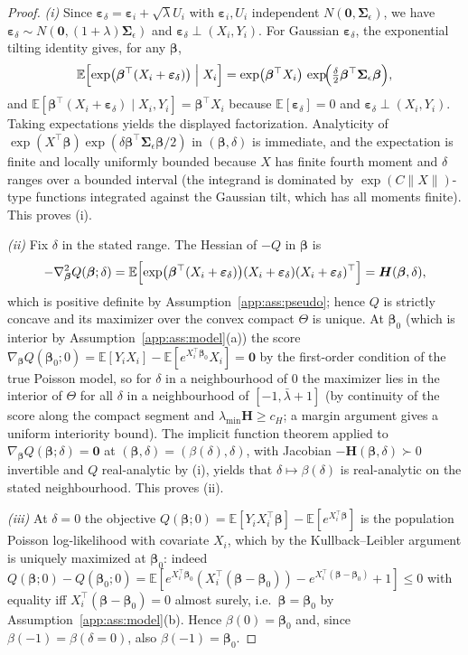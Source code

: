 \documentclass[11pt]{article}
\theoremstyle{plain}
\theoremstyle{definition}
\newcommand{\E}{\mathbb{E}}
\newcommand{\bet}{\bm{\beta}}
\newcommand{\beps}{\bm{\varepsilon}}
\newcommand{\bSig}{\bm{\Sigma}}
\begin{document}
\begin{proof}
\emph{(i)} Since $\beps_\delta=\beps_i+\sqrt\lambda U_i$ with
$\beps_i,U_i$ independent $N(\bm 0,\bSig_\epsilon)$, we have
$\beps_\delta\sim N(\bm 0,(1+\lambda)\bSig_\epsilon)$ and
$\beps_\delta\perp(X_i,Y_i)$. For Gaussian $\beps_\delta$, the exponential
tilting identity gives, for any $\bet$,
\[
  \E\Bigl[\exp\bigl(\bet^\top(X_i+\beps_\delta)\bigr)\Bigm|X_i\Bigr]
  =\exp\bigl(\bet^\top X_i\bigr)\,
   \exp\!\Bigl(\tfrac{\delta}{2}\bet^\top\bSig_\epsilon\bet\Bigr),
\]
and $\E[\bet^\top(X_i+\beps_\delta)\mid X_i,Y_i]=\bet^\top X_i$ because
$\E[\beps_\delta]=0$ and $\beps_\delta\perp(X_i,Y_i)$. Taking expectations
yields the displayed factorization. Analyticity of
$\exp(X^\top\bet)\exp(\delta\bet^\top\bSig_\epsilon\bet/2)$ in
$(\bet,\delta)$ is immediate, and the expectation is finite and
locally uniformly bounded because $X$ has finite fourth moment and
$\delta$ ranges over a bounded interval (the integrand is dominated by
$\exp(C\|X\|)$-type functions integrated against the Gaussian tilt, which
has all moments finite). This proves (i).

\emph{(ii)} Fix $\delta$ in the stated range. The Hessian of $-Q$ in
$\bet$ is
\[
  -\nabla_{\bet}^2Q(\bet;\delta)
  =\E\Bigl[\exp\bigl(\bet^\top(X_i+\beps_\delta)\bigr)
   (X_i+\beps_\delta)(X_i+\beps_\delta)^\top\Bigr]
  =\bm H(\bet,\delta),
\]
which is positive definite by Assumption~\ref{app:ass:pseudo}; hence $Q$ is
strictly concave and its maximizer over the convex compact $\Theta$ is
unique. At $\bet_0$ (which is interior by Assumption~\ref{app:ass:model}(a))
the score
$\nabla_{\bet} Q(\bet_0;0)=\E[Y_iX_i]-\E[e^{X_i^\top\bet_0}X_i]=\bm 0$
by the first-order condition of the true Poisson model, so for $\delta$
in a neighbourhood of $0$ the maximizer lies in the interior of $\Theta$
for all $\delta$ in a neighbourhood of $[-1,\bar\lambda+1]$
(by continuity of the score along the compact segment and
$\lambda_{\min}\bm H\ge c_H$; a margin argument gives a uniform interiority
bound). The implicit function theorem applied to
$\nabla_{\bet} Q(\bet;\delta)=\bm 0$ at $(\bet,\delta)=(\beta(\delta),\delta)$,
with Jacobian $-\bm H(\bet,\delta)\succ 0$ invertible and
$Q$ real-analytic by (i), yields that $\delta\mapsto\beta(\delta)$ is
real-analytic on the stated neighbourhood. This proves (ii).

\emph{(iii)} At $\delta=0$ the objective
$Q(\bet;0)=\E[Y_iX_i^\top\bet]-\E[e^{X_i^\top\bet}]$ is the population
Poisson log-likelihood with covariate $X_i$, which by the Kullback--Leibler
argument is uniquely maximized at $\bet_0$: indeed
$Q(\bet;0)-Q(\bet_0;0)=\E[e^{X_i^\top\bet_0}(X_i^\top(\bet-\bet_0))
- e^{X_i^\top(\bet-\bet_0)}+1]\le 0$ with equality iff
$X_i^\top(\bet-\bet_0)=0$ almost surely, i.e.\ $\bet=\bet_0$ by
Assumption~\ref{app:ass:model}(b). Hence $\beta(0)=\bet_0$ and, since
$\beta(-1)=\beta(\delta=0)$, also $\beta(-1)=\bet_0$.


\end{proof}
\end{document}
